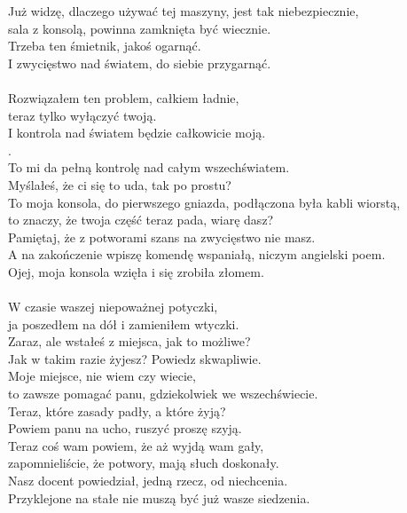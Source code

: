 \charszam{}
Już widzę, dlaczego używać tej maszyny, jest tak niebezpiecznie,\\
sala z konsolą, powinna zamknięta być wiecznie.\\
Trzeba ten śmietnik, jakoś ogarnąć.\\
I zwycięstwo nad światem, do siebie przygarnąć.\\
\\
Rozwiązałem ten problem, całkiem ładnie,\\
teraz tylko wyłączyć twoją.\\
I kontrola nad światem będzie całkowicie moją.\\
.\\
To mi da pełną kontrolę nad całym wszechświatem.\\

\charfer{}
Myślałeś, że ci się to uda, tak po prostu?\\
To moja konsola, do pierwszego gniazda, podłączona była kabli wiorstą,\\
to znaczy, że twoja część teraz pada, wiarę dasz?\\
Pamiętaj, że z potworami szans na zwycięstwo nie masz.\\
A na zakończenie wpiszę komendę wspaniałą, niczym angielski poem.\\
Ojej, moja konsola wzięła i się zrobiła złomem.\\

\\

\chardoc{}
W czasie waszej niepoważnej potyczki,\\
ja poszedłem na dół i zamieniłem wtyczki.\\

\charszam{}
Zaraz, ale wstałeś z miejsca, jak to możliwe?\\
Jak w takim razie żyjesz? Powiedz skwapliwie.\\

\chardoc{}
Moje miejsce, nie wiem czy wiecie,\\
to zawsze pomagać panu, gdziekolwiek we wszechświecie.\\
Teraz, które zasady padły, a które żyją?\\
Powiem panu na ucho, ruszyć proszę szyją.\\

\charfer{}
Teraz coś wam powiem, że aż wyjdą wam gały,\\
zapomnieliście, że potwory, mają słuch doskonały.\\
Nasz docent powiedział, jedną rzecz, od niechcenia.\\
Przyklejone na stałe nie muszą być już wasze siedzenia.\\


